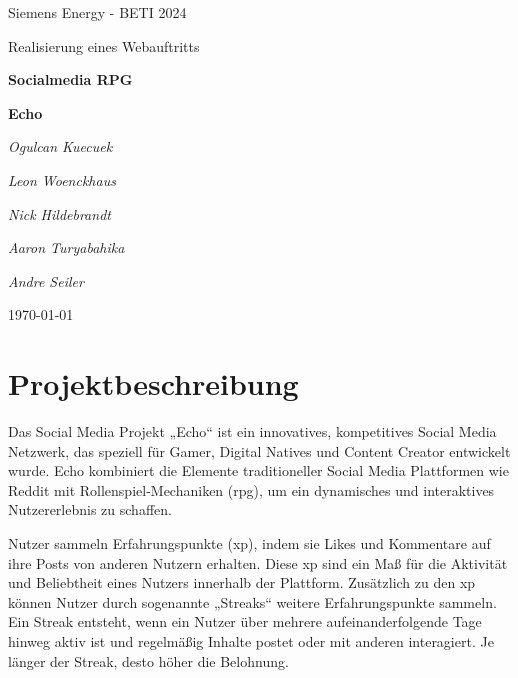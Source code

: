 \documentclass[a4paper,12pt]{article}
\begin{document}
\begin{titlepage}
	\centering
	{\LARGE Siemens Energy - BETI 2024 \par}
	\vspace{0.5cm}
	{\Large Realisierung eines Webauftritts \par}
	\vspace{3.5cm}
	{\huge\bfseries Socialmedia RPG \par}
	{\huge\bfseries Echo \par}
	\vspace{3cm}
	{\Large\itshape Ogulcan Kuecuek \par}
	{\Large\itshape Leon Woenckhaus \par}
	{\Large\itshape Nick Hildebrandt \par}
	{\Large\itshape Aaron Turyabahika \par}
	{\Large\itshape Andre Seiler \par}
	\vfill
	{\large \today\par}
\end{titlepage}
\newpage

\tableofcontents
\newpage

\listoffigures
\newpage

\printglossary[type=\acronymtype, title=Abkürzungsverzeichnis]
\newpage

\setcounter{page}{1}

\section{Projektbeschreibung}
Das Social Media Projekt „Echo“ ist ein innovatives, kompetitives Social Media Netzwerk, das speziell für Gamer, Digital Natives und Content Creator entwickelt wurde. Echo kombiniert die Elemente traditioneller Social Media Plattformen wie Reddit mit Rollenspiel-Mechaniken (\gls{rpg}), um ein dynamisches und interaktives Nutzererlebnis zu schaffen.

Nutzer sammeln Erfahrungspunkte (\gls{xp}), indem sie Likes und Kommentare auf ihre Posts von anderen Nutzern erhalten. Diese \gls{xp} sind ein Maß für die Aktivität und Beliebtheit eines Nutzers innerhalb der Plattform. Zusätzlich zu den \gls{xp} können Nutzer durch sogenannte „Streaks“ weitere Erfahrungspunkte sammeln. Ein Streak entsteht, wenn ein Nutzer über mehrere aufeinanderfolgende Tage hinweg aktiv ist und regelmäßig Inhalte postet oder mit anderen interagiert. Je länger der Streak, desto höher die Belohnung.
\end{document}
